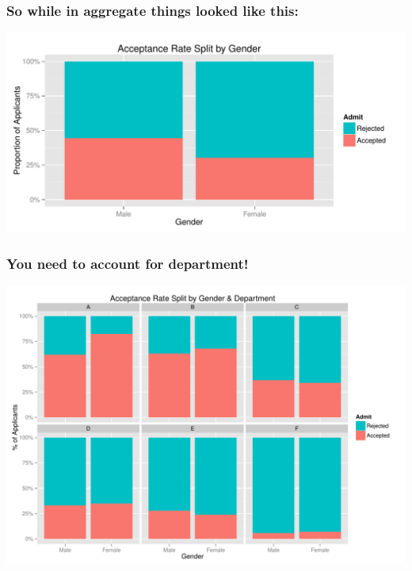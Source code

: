 \documentclass[handout]{beamer}
\begin{document}
\begin{frame}
\frametitle{So while in aggregate things looked like this:}

\begin{center}
\includegraphics[width=\textwidth]{figure/gender-accpt.pdf}
\end{center}

\end{frame}



\begin{frame}
\frametitle{You need to account for department!}

\begin{center}
\includegraphics[width=\textwidth]{figure/split-accpt.pdf}
\end{center}

\end{frame}
\end{document}
